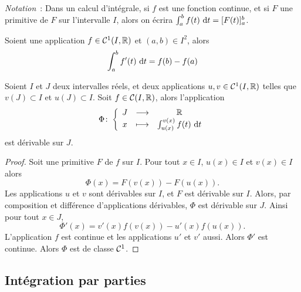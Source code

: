\emph{Notation}~: Dans un calcul d'intégrale, si \(f\) est une fonction 
continue,  et si \(F\) une primitive de \(F\) sur l'intervalle \(I\), alors on 
écrira \(\int_a^b f(t)\,\mathop{}\mathopen{}\mathrm{d} t = [F(t)]_a^b\).

\begin{corth}
  Soient une application \(f \in \mathcal{C}^{1}(I,\mathbb{R})\) et \((a,b) \in I^2\), alors
  \begin{equation}
    \int_a^b f'(t)\,\mathop{}\mathopen{}\mathrm{d} t = f(b)-f(a)
  \end{equation}
\end{corth}

\begin{prop}
  Soient \(I\) et \(J\) deux intervalles réels, et deux applications \(u,v \in 
  \mathcal{C}^{1}(I,\mathbb{R})\) telles que \(v(J) \subset I\) et \(u(J) \subset I\). Soit 
  \(f \in \mathcal{C}(I,\mathbb{R})\), alors l'application
  \begin{equation}
    \Phi\colon\left\{\begin{array}{ccc}J & \longrightarrow &\mathbb{R}\\x & \longmapsto & \int_{u(x)}^{v(x)}f(t)\,\mathop{}\mathopen{}\mathrm{d} t\end{array}\right.
  \end{equation}
  est dérivable sur \(J\).
\end{prop}
\begin{proof}
  Soit une primitive \(F\) de \(f\) sur \(I\). Pour tout \(x \in I\), \(u(x) \in 
  I\) et \(v(x) \in I\) alors
  \begin{equation}
    \Phi(x) = F(v(x))-F(u(x)).
  \end{equation}
  Les applications \(u\) et \(v\) sont dérivables sur \(I\), et \(F\) est 
  dérivable sur \(I\). Alors, par composition et différence d'applications 
  dérivables, \(\Phi\) est dérivable sur \(J\). Ainsi pour tout \(x \in J\),
  \begin{equation}
    \Phi'(x) = v'(x)f(v(x)) -u'(x)f(u(x)).
  \end{equation}
  L'application \(f\) est continue et les applications \(u'\) et \(v'\) aussi. 
  Alors \(\Phi'\) est continue. Alors \(\Phi\) est de classe \(\mathcal{C}^{1}\).
\end{proof}

\subsection{Intégration par parties}

